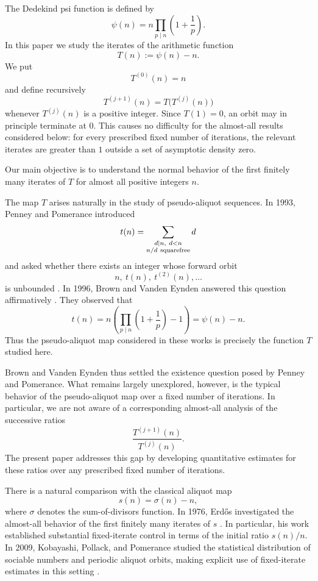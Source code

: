 \documentclass{article}
\begin{document}
The Dedekind psi function is defined by
\[
\psi(n)
=
n\prod_{p\mid n}\left(1+\frac1p\right).
\]
In this paper we study the iterates of the arithmetic function
\[
T(n):=\psi(n)-n.
\]
We put
\[
T^{(0)}(n)=n
\]
and define recursively
\[
T^{(j+1)}(n)
=
T\bigl(T^{(j)}(n)\bigr)
\]
whenever $T^{(j)}(n)$ is a positive integer. Since $T(1)=0$, an
orbit may in principle terminate at $0$. This causes no difficulty
for the almost-all results considered below: for every prescribed
fixed number of iterations, the relevant iterates are greater than
$1$ outside a set of asymptotic density zero.

Our main objective is to understand the normal behavior of the first
finitely many iterates of $T$ for almost all positive integers $n$.

The map $T$ arises naturally in the study of pseudo-aliquot
sequences. In 1993, Penney and Pomerance introduced
\[
t(n)
=
\sum_{\substack{d\mid n,\ d<n\\ n/d\ {\rm squarefree}}}d
\]
and asked whether there exists an integer whose forward orbit
\[
n,\ t(n),\ t^{(2)}(n),\ldots
\]
is unbounded \cite{PenneyPomerance1993}. In 1996, Brown and
Vanden Eynden answered this question affirmatively
\cite{BrownVandenEynden1996}. They observed that
\[
t(n)
=
n\left(
\prod_{p\mid n}\left(1+\frac1p\right)-1
\right)
=
\psi(n)-n.
\]
Thus the pseudo-aliquot map considered in these works is precisely
the function $T$ studied here.

Brown and Vanden Eynden thus settled the existence question posed by
Penney and Pomerance. What remains largely unexplored, however, is
the typical behavior of the pseudo-aliquot map over a fixed number of
iterations. In particular, we are not aware of a corresponding
almost-all analysis of the successive ratios
\[
\frac{T^{(j+1)}(n)}{T^{(j)}(n)}.
\]
The present paper addresses this gap by developing quantitative
estimates for these ratios over any prescribed fixed number of
iterations.

There is a natural comparison with the classical aliquot map
\[
s(n)=\sigma(n)-n,
\]
where $\sigma$ denotes the sum-of-divisors function. In 1976,
Erd\H{o}s investigated the almost-all behavior of the first finitely
many iterates of $s$ \cite{Erdos1976}. In particular, his work
established substantial fixed-iterate control in terms of the initial
ratio $s(n)/n$. In 2009, Kobayashi, Pollack, and Pomerance studied
the statistical distribution of sociable numbers and periodic aliquot
orbits, making explicit use of fixed-iterate estimates in this setting
\cite{KobayashiPollackPomerance2009}.
\end{document}
